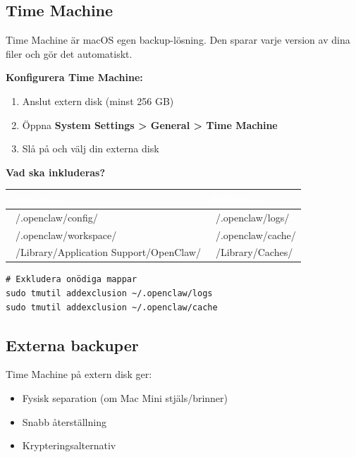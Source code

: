 \documentclass[12pt,a4paper,swedish]{article}
\begin{document}
\subsection{Time Machine}
\label{sec:timemachine}

Time Machine är macOS egen backup-lösning. Den sparar varje version av dina filer och gör det automatiskt.

\bigskip

\textbf{Konfigurera Time Machine:}

\begin{enumerate}
    \item Anslut extern disk (minst 256 GB)
    \item Öppna \textbf{System Settings > General > Time Machine}
    \item Slå på och välj din externa disk
\end{enumerate}

\bigskip

\textbf{Vad ska inkluderas?}

\begin{center}
\begin{tabular}{|p{5cm}|p{5cm}|}
\hline
\rowcolor{success}
\textcolor{white}{\textbf{Inkludera}} & \rowcolor{warning}
\textcolor{white}{\textbf{Exkludera}} \\
\hline
~/.openclaw/config/ & ~/.openclaw/logs/ \\
\hline
~/.openclaw/workspace/ & ~/.openclaw/cache/ \\
\hline
~/Library/Application Support/OpenClaw/ & ~/Library/Caches/ \\
\hline
\end{tabular}
\end{center}

\bigskip

\begin{lstlisting}[style=latex]
# Exkludera onödiga mappar
sudo tmutil addexclusion ~/.openclaw/logs
sudo tmutil addexclusion ~/.openclaw/cache
\end{lstlisting}

\subsection{Externa backuper}
\label{sec:extern-backup}

Time Machine på extern disk ger:
\begin{itemize}
    \item Fysisk separation (om Mac Mini stjäls/brinner)
    \item Snabb återställning
    \item Krypteringsalternativ
\end{itemize}
\end{document}
